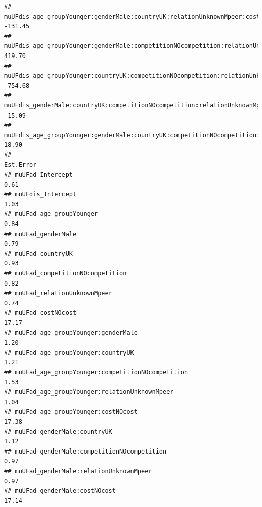\documentclass[
]{article}
\begin{document}
\begin{verbatim}
## muUFdis_age_groupYounger:genderMale:countryUK:relationUnknownMpeer:costNOcost                           -131.45
## muUFdis_age_groupYounger:genderMale:competitionNOcompetition:relationUnknownMpeer:costNOcost             419.70
## muUFdis_age_groupYounger:countryUK:competitionNOcompetition:relationUnknownMpeer:costNOcost             -754.68
## muUFdis_genderMale:countryUK:competitionNOcompetition:relationUnknownMpeer:costNOcost                    -15.09
## muUFdis_age_groupYounger:genderMale:countryUK:competitionNOcompetition:relationUnknownMpeer:costNOcost    18.90
##                                                                                                        Est.Error
## muUFad_Intercept                                                                                            0.61
## muUFdis_Intercept                                                                                           1.03
## muUFad_age_groupYounger                                                                                     0.84
## muUFad_genderMale                                                                                           0.79
## muUFad_countryUK                                                                                            0.93
## muUFad_competitionNOcompetition                                                                             0.82
## muUFad_relationUnknownMpeer                                                                                 0.74
## muUFad_costNOcost                                                                                          17.17
## muUFad_age_groupYounger:genderMale                                                                          1.20
## muUFad_age_groupYounger:countryUK                                                                           1.21
## muUFad_age_groupYounger:competitionNOcompetition                                                            1.53
## muUFad_age_groupYounger:relationUnknownMpeer                                                                1.04
## muUFad_age_groupYounger:costNOcost                                                                         17.38
## muUFad_genderMale:countryUK                                                                                 1.12
## muUFad_genderMale:competitionNOcompetition                                                                  0.97
## muUFad_genderMale:relationUnknownMpeer                                                                      0.97
## muUFad_genderMale:costNOcost                                                                               17.14

\end{verbatim}
\end{document}

